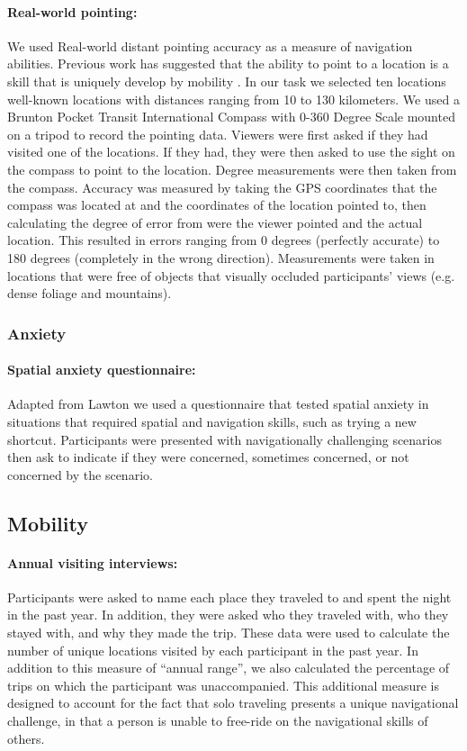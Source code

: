 \paragraph{Real-world pointing:}  We used Real-world distant pointing accuracy as a measure of navigation abilities. Previous work has suggested that the ability to point to a location is a skill that is uniquely develop by mobility \cite{bell2004relationship}. In our task we selected ten locations well-known locations with distances ranging from 10 to 130 kilometers. We used a Brunton Pocket Transit International Compass with 0-360 Degree Scale mounted on a tripod to record the pointing data. Viewers were first asked if they had visited one of the locations. If they had, they were then asked to use the sight on the compass to point to the location. Degree measurements were then taken from the compass. Accuracy was measured by taking the GPS coordinates that the compass was located at and the coordinates of the location pointed to, then calculating the degree of error from were the viewer pointed and the actual location. This resulted in errors ranging from 0 degrees (perfectly accurate) to 180 degrees (completely in the wrong direction). Measurements were taken in locations that were free of objects that visually occluded participants' views (e.g. dense foliage and mountains).

		\subsubsection{Anxiety}
		\label{sec:2.2.3}
		
\paragraph{Spatial anxiety questionnaire:}  Adapted from Lawton \citep{lawton1994gender} we used a questionnaire that tested spatial anxiety in situations that required spatial and navigation skills, such as trying a new shortcut. Participants were presented with navigationally challenging scenarios then ask to indicate if they were concerned, sometimes concerned, or not concerned by the scenario.

	\subsection{Mobility}
	\label{sec:2.2.4}
	
\paragraph{Annual visiting interviews:}  Participants were asked to name each place they traveled to and spent the night in the past year.  In addition, they were asked who they traveled with, who they stayed with, and why they made the trip.  These data were used to calculate the number of unique locations visited by each participant in the past year.  In addition to this measure of ``annual range'', we also calculated the percentage of trips on which the participant was unaccompanied.  This additional measure is designed to account for the fact that solo traveling presents a unique navigational challenge, in that a person is unable to free-ride on the navigational skills of others.


